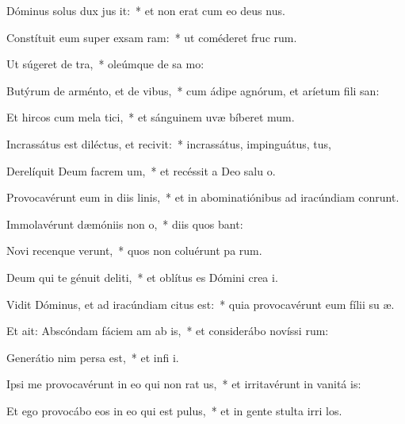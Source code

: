 \item Dóminus solus dux jus it:~* et non erat cum eo deus nus.
\item Constítuit eum super exsam ram:~* ut coméderet fruc rum.
\item Ut súgeret  de tra,~* oleúmque de sa mo:
\item Butýrum de arménto, et  de vibus,~* cum ádipe agnórum, et aríetum fili san:
\item Et hircos cum mela tici,~* et sánguinem uvæ bíberet mum.
\item Incrassátus est diléctus, et recivit:~* incrassátus, impinguátus, tus,
\item Derelíquit Deum facrem um,~* et recéssit a Deo salu o.
\item Provocavérunt eum in diis linis,~* et in abominatiónibus ad iracúndiam conrunt.
\item Immolavérunt dæmóniis  non o,~* diis quos bant:
\item Novi recenque verunt,~* quos non coluérunt pa rum.
\item Deum qui te génuit deliti,~* et oblítus es Dómini crea i.
\item \singlecolsep
\item Vidit Dóminus, et ad iracúndiam citus est:~* quia provocavérunt eum fílii su  æ.
\item Et ait: Abscóndam fáciem am ab is,~* et considerábo novíssi rum:
\item Generátio nim persa est,~* et infi i.
\item Ipsi me provocavérunt in eo qui non rat us,~* et irritavérunt in vanitá is:
\item Et ego provocábo eos in eo qui  est pulus,~* et in gente stulta irri los.
